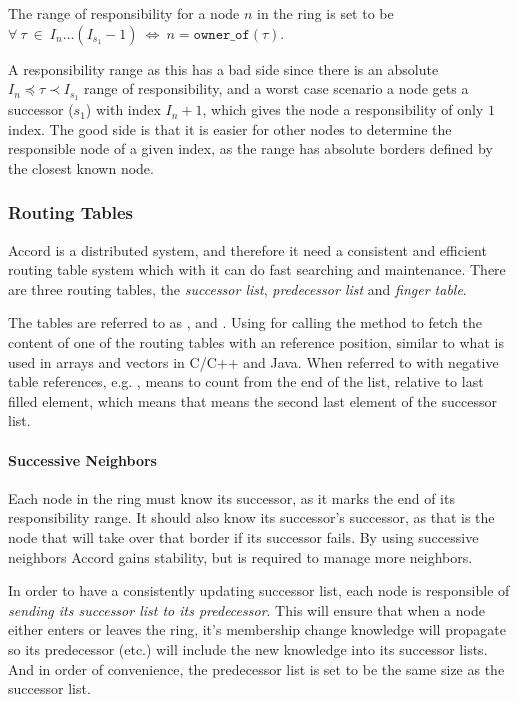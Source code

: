 The range of responsibility for a node $n$ in the ring is set to be
 $\forall\ \tau\ \in\ I_n\ldots(I_{s_1}-1)\ \Leftrightarrow\ n=\mathtt{owner\_of(\tau)}$.

A responsibility range as this has a bad side since there is an absolute
 $I_n\preceq\tau\prec I_{s_1}$ range of responsibility,
 and a worst case scenario a node gets a successor ($s_1$)
 with index $I_n+1$, which gives the node a responsibility of only $1$ index. The good side
 is that it is easier for other nodes to determine the responsible node of a given
 index, as the range has absolute borders defined by the closest known node.


\subsubsection{Routing Tables}

Accord is a distributed system, and therefore it need a consistent and efficient
 routing table system which with it can do fast searching and maintenance.
 There are three routing tables, the {\em successor list}, {\em predecessor list}
 and {\em finger table}.

The tables are referred to as ,  and .
 Using 
 for calling the method to fetch the content of one of the routing tables with an
 reference position, similar to what is used in arrays and vectors in C/C++ and Java.
 When referred to with negative table references, e.g. , means to
 count from the end of the list, relative to last filled element, which means that
  means the second last element of the successor list.

\paragraph{Successive Neighbors}
Each node in the ring must know its successor, as it marks the end
 of its responsibility range. It should also know its successor's successor,
 as that is the node that will take over that border if its successor fails. By
 using successive neighbors Accord gains stability, but is required to manage
 more neighbors.

In order to have a consistently updating successor list, each node is responsible of
 \emph{sending its successor list to its predecessor}. This will ensure that when a
 node either enters or leaves the ring, it's membership change knowledge
 will propagate so its predecessor (etc.)
 will include the new knowledge into its successor lists.
 And in order of convenience, the predecessor list is set to be the same size as the
 successor list.

